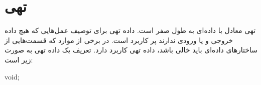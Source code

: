 
\section{تهی}


تهی معادل با داده‌ای به طول صفر است. داده تهی برای توصیف عمل‌هایی که هیچ داده
خروجی و یا ورودی ندارند پر کاربرد است.
در برخی از موارد که قسمت‌هایی از ساختارهای داده‌ای باید خالی باشد، داده تهی
کاربرد دارد.
تعریف یک داده تهی به صورت زیر است:

\begin{C++}
void;
\end{C++}

% 
% 
